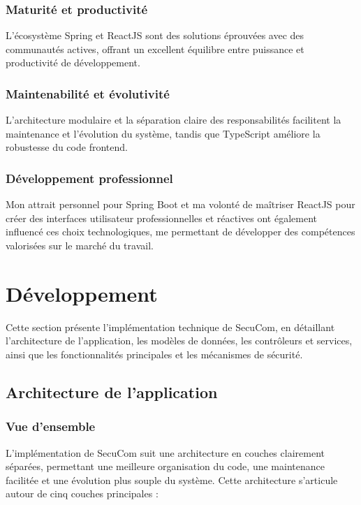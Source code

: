 \documentclass[12pt,a4paper]{report}
\begin{document}
\subsection{Maturité et productivité}

L'écosystème Spring et ReactJS sont des solutions éprouvées avec des communautés actives, offrant un excellent équilibre entre puissance et productivité de développement.

\subsection{Maintenabilité et évolutivité}

L'architecture modulaire et la séparation claire des responsabilités facilitent la maintenance et l'évolution du système, tandis que TypeScript améliore la robustesse du code frontend.

\subsection{Développement professionnel}

Mon attrait personnel pour Spring Boot et ma volonté de maîtriser ReactJS pour créer des interfaces utilisateur professionnelles et réactives ont également influencé ces choix technologiques, me permettant de développer des compétences valorisées sur le marché du travail.

\chapter{Développement}

Cette section présente l'implémentation technique de SecuCom, en détaillant l'architecture de l'application, les modèles de données, les contrôleurs et services, ainsi que les fonctionnalités principales et les mécanismes de sécurité.

\section{Architecture de l'application}

\subsection{Vue d'ensemble}

L'implémentation de SecuCom suit une architecture en couches clairement séparées, permettant une meilleure organisation du code, une maintenance facilitée et une évolution plus souple du système. Cette architecture s'articule autour de cinq couches principales :
\end{document}
